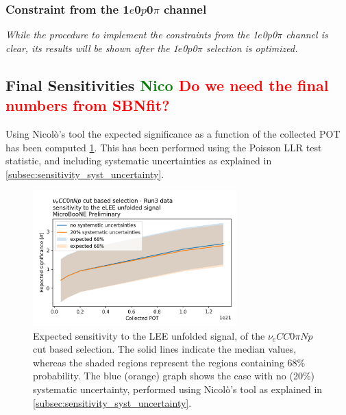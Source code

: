 \documentclass[a4paper]{article}
\newcommand{\nueccnopinp}{$\nu_e CC 0\pi Np$ }
\newcommand{\zpsel}{1$e$0$p$0$\pi$ }
\begin{document}
\subsubsection{Constraint from the \zpsel channel}
\label{sec:1e0pconstraint}
\emph{While the procedure to implement the constraints from the \zpsel channel is clear, its results will be shown after the \zpsel selection is optimized.}


\subsection{Final Sensitivities \textcolor{green}{Nico} \textcolor{red}{Do we need the final numbers from SBNfit?}}

Using Nicol\`o's tool the expected significance as a function of the collected POT has been computed \ref{fig:sensitivity_function_pot}.
This has been performed using the Poisson LLR test statistic, and including systematic uncertainties as explained in \ref{subsec:sensitivity_syst_uncertainty}.

\begin{figure}[H]
    \begin{center}
    \includegraphics[width=0.7\textwidth]{Sensitivity/sensitivity_vs_pot.png}
    \caption{Expected sensitivity to the LEE unfolded signal, of the \nueccnopinp cut based selection. The solid lines indicate the median values, whereas the shaded regions represent the regions containing 68\% probability.
    The blue (orange) graph shows the case with no (20\%) systematic uncertainty, performed using Nicol\`o's tool as explained in \ref{subsec:sensitivity_syst_uncertainty}.
    }
    \label{fig:sensitivity_function_pot}
    \end{center}
\end{figure}
\end{document}
